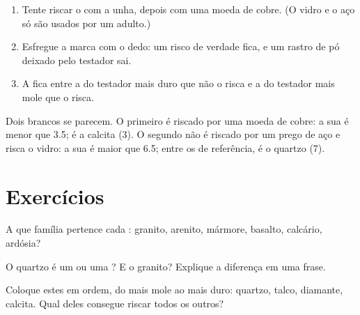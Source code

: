 \begin{method}\label{met:g6:rocks-and-minerals:scratch}
\begin{enumerate}
  \item Tente riscar o  com a unha, depois com uma moeda de cobre.
        (O vidro e o aço só são usados por um adulto.)
  \item Esfregue a marca com o dedo: um risco de verdade fica, e um rastro
        de pó deixado pelo testador sai.
  \item A  fica entre a do testador mais duro que não o risca e a do
        testador mais mole que o risca.
\end{enumerate}
\end{method}

\begin{example}\label{ex:g6:rocks-and-minerals:quartz-calcite}
Dois  brancos se parecem. O primeiro é riscado por uma moeda de
cobre: a sua  é menor que 3.5; é a calcita (3). O segundo não é
riscado por um prego de aço e risca o vidro: a sua  é maior que
6.5; entre os  de referência, é o quartzo (7).
\end{example}

\section{Exercícios}

\begin{exercise}[$\star$]\label{exo:g6:rocks-and-minerals:1}
A que família pertence cada : granito, arenito, mármore, basalto,
calcário, ardósia?
\end{exercise}

\begin{exercise}[$\star$]\label{exo:g6:rocks-and-minerals:2}
O quartzo é um  ou uma ? E o granito? Explique a diferença em
uma frase.
\end{exercise}

\begin{exercise}[$\star$]\label{exo:g6:rocks-and-minerals:3}
Coloque estes  em ordem, do mais mole ao mais duro: quartzo,
talco, diamante, calcita. Qual deles consegue riscar todos os outros?
\end{exercise}

